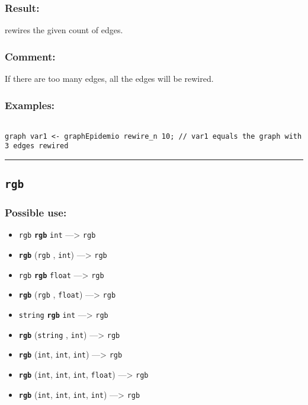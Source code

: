 \documentclass[]{book}
\providecommand{\tightlist}{%
  \setlength{\itemsep}{0pt}\setlength{\parskip}{0pt}}
\theoremstyle{definition}
\theoremstyle{definition}
\theoremstyle{definition}
\theoremstyle{remark}
\begin{document}
\subsubsection{Result:}\label{result-422}

rewires the given count of edges.

\subsubsection{Comment:}\label{comment-84}

If there are too many edges, all the edges will be rewired.

\subsubsection{Examples:}\label{examples-299}

\begin{verbatim}
 
graph var1 <- graphEpidemio rewire_n 10; // var1 equals the graph with 3 edges rewired
\end{verbatim}

\begin{center}\rule{0.5\linewidth}{\linethickness}\end{center}

\subsection{\texorpdfstring{\texttt{rgb}}{rgb}}\label{rgb}

\subsubsection{Possible use:}\label{possible-use-437}

\begin{itemize}
\tightlist
\item
  \texttt{rgb} \textbf{\texttt{rgb}} \texttt{int} ---\textgreater{}
  \texttt{rgb}
\item
  \textbf{\texttt{rgb}} (\texttt{rgb} , \texttt{int}) ---\textgreater{}
  \texttt{rgb}
\item
  \texttt{rgb} \textbf{\texttt{rgb}} \texttt{float} ---\textgreater{}
  \texttt{rgb}
\item
  \textbf{\texttt{rgb}} (\texttt{rgb} , \texttt{float})
  ---\textgreater{} \texttt{rgb}
\item
  \texttt{string} \textbf{\texttt{rgb}} \texttt{int} ---\textgreater{}
  \texttt{rgb}
\item
  \textbf{\texttt{rgb}} (\texttt{string} , \texttt{int})
  ---\textgreater{} \texttt{rgb}
\item
  \textbf{\texttt{rgb}} (\texttt{int}, \texttt{int}, \texttt{int})
  ---\textgreater{} \texttt{rgb}
\item
  \textbf{\texttt{rgb}} (\texttt{int}, \texttt{int}, \texttt{int},
  \texttt{float}) ---\textgreater{} \texttt{rgb}
\item
  \textbf{\texttt{rgb}} (\texttt{int}, \texttt{int}, \texttt{int},
  \texttt{int}) ---\textgreater{} \texttt{rgb}
\end{itemize}
\end{document}
